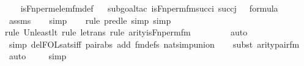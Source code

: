 \begin{isabellebody}
%
\isadelimproof
\isanewline
\ \ %
\endisadelimproof
%
\isatagproof
{}\isamarkupfalse%
\ is{\isacharunderscore}{\kern0pt}Fn{\isacharunderscore}{\kern0pt}perm{\isacharprime}{\kern0pt}{\isacharunderscore}{\kern0pt}elem{\isacharunderscore}{\kern0pt}fm{\isacharunderscore}{\kern0pt}def\isanewline
\ \ \isamarkupfalse%
{\isacharparenleft}{\kern0pt}subgoal{\isacharunderscore}{\kern0pt}tac\ {\isachardoublequoteopen}is{\isacharunderscore}{\kern0pt}Fn{\isacharunderscore}{\kern0pt}perm{\isacharunderscore}{\kern0pt}fm{\isacharparenleft}{\kern0pt}succ{\isacharparenleft}{\kern0pt}i{\isacharparenright}{\kern0pt}{\isacharcomma}{\kern0pt}\ succ{\isacharparenleft}{\kern0pt}j{\isacharparenright}{\kern0pt}{\isacharcomma}{\kern0pt}\ {}{\isacharparenright}{\kern0pt}\ {\isasymin}\ formula{\isachardoublequoteclose}{\isacharparenright}{\kern0pt}\isanewline
\ \ \isamarkupfalse%
\ assms\isanewline
\ \ \isamarkupfalse%
\ simp\isanewline
\ \ \ \isamarkupfalse%
{\isacharparenleft}{\kern0pt}rule\ pred{\isacharunderscore}{\kern0pt}le{\isacharcomma}{\kern0pt}\ simp{\isacharcomma}{\kern0pt}\ simp{\isacharparenright}{\kern0pt}\isanewline
\ \ \ \isamarkupfalse%
{\isacharparenleft}{\kern0pt}rule\ Un{\isacharunderscore}{\kern0pt}least{\isacharunderscore}{\kern0pt}lt{\isacharcomma}{\kern0pt}\ rule\ le{\isacharunderscore}{\kern0pt}trans{\isacharcomma}{\kern0pt}\ rule\ arity{\isacharunderscore}{\kern0pt}is{\isacharunderscore}{\kern0pt}Fn{\isacharunderscore}{\kern0pt}perm{\isacharunderscore}{\kern0pt}fm{\isacharparenright}{\kern0pt}\isanewline
\ \ \ \ \ \ \ \isamarkupfalse%
\ auto{\isacharbrackleft}{\kern0pt}{}{\isacharbrackright}{\kern0pt}\isanewline
\ \ \ \ \isamarkupfalse%
\ {\isacharparenleft}{\kern0pt}simp\ del{\isacharcolon}{\kern0pt}FOL{\isacharunderscore}{\kern0pt}sats{\isacharunderscore}{\kern0pt}iff\ pair{\isacharunderscore}{\kern0pt}abs\ add{\isacharcolon}{\kern0pt}\ fm{\isacharunderscore}{\kern0pt}defs\ nat{\isacharunderscore}{\kern0pt}simp{\isacharunderscore}{\kern0pt}union{\isacharparenright}{\kern0pt}\isanewline
\ \ \ \isamarkupfalse%
{\isacharparenleft}{\kern0pt}subst\ arity{\isacharunderscore}{\kern0pt}pair{\isacharunderscore}{\kern0pt}fm{\isacharparenright}{\kern0pt}\isanewline
\ \ \isamarkupfalse%
\ auto{\isacharbrackleft}{\kern0pt}{}{\isacharbrackright}{\kern0pt}\isanewline
\ \ \ \isamarkupfalse%
\ simp\isanewline
\ \ \ \isamarkupfalse%

\end{isabellebody}
